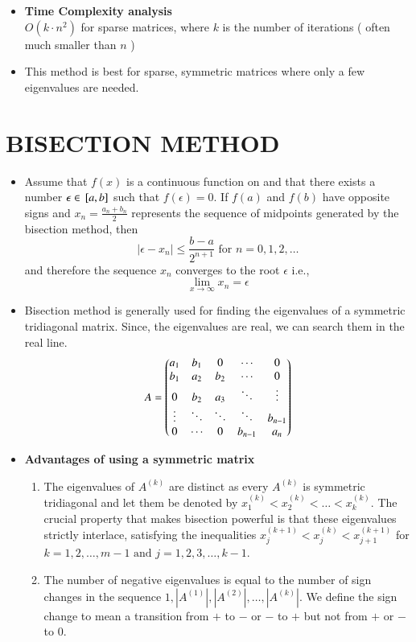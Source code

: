 \documentclass[report,12pt,onecolumn]{IEEEtran}
\theoremstyle{remark}
\begin{document}
\begin{itemize}
\begin{itemize}
\begin{enumerate}
						
				\end{enumerate}
			\item \textbf{Time Complexity analysis} \\
				$O(k \cdot n^2)$ for sparse matrices, where $k$ is the number of iterations ( often much smaller than $n$ )
			\item This method is best for sparse, symmetric matrices where only a few eigenvalues are needed.
		\end{itemize}
		\section{BISECTION METHOD}
		\begin{itemize}
			\item Assume that $f(x)$ is a continuous function on  and that there exists a number $\epsilon \in {}\left[a,b\right]$ such that $f(\epsilon) = 0$. If $f(a)$ and $f(b)$ have opposite signs and $x_n = \frac{a_n + b_n}{2}$ represents the sequence of midpoints generated by the bisection method, then
				$$ | \epsilon - x_n | \leq \frac{b-a}{2^{n+1}} \text{ for } n = 0, 1, 2, \dots $$
				and therefore the sequence $x_n$ converges to the root $\epsilon$ i.e., 
				$$ \lim_{x \to \infty} x_n = \epsilon $$
			\item Bisection method is generally used for finding the eigenvalues of a symmetric tridiagonal matrix. Since, the eigenvalues are real, we can search them in the real line.
				$$ A = \begin{pmatrix}a_1 & b_1 & 0 & \cdots & 0 \\
b_1 & a_2 & b_2 & \cdots & 0 \\
0 & b_2 & a_3 & \ddots & \vdots \\
\vdots & \ddots & \ddots & \ddots & b_{n-1} \\
				0 & \cdots & 0 & b_{n-1} & a_n\end{pmatrix} $$
			\item \textbf{Advantages of using a symmetric matrix} \\
				\begin{enumerate}
					\item The eigenvalues of $A^{(k)}$ are distinct as every $A^{(k)}$ is symmetric tridiagonal and let them be denoted by $x_1^{(k)} < x_2^{(k)} < \dots < x_k^{(k)}$. The crucial property that makes bisection powerful is that these eigenvalues strictly interlace, satisfying the inequalities $x_j^{(k+1)} < x_j^{(k)} < x_{j+1}^{(k+1)}$ for $k = 1, 2, \dots, m-1 \text{ and } j = 1, 2, 3, \dots, k-1 $.
					\item The number of negative eigenvalues is equal to the number of sign changes in the sequence $1, |A^{(1)}|, |A^{(2)}|, \dots, |A^{(k)}|$. We define the sign change to mean a transition from $+$ to $-$ or $-$ to $+$ but not from $+$ or $-$ to 0.

\end{enumerate}
\end{itemize}
\end{itemize}
\end{document}
